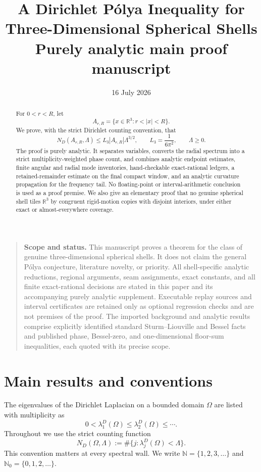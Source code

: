 \documentclass[11pt]{article}
\title{A Dirichlet P\'olya Inequality for\\Three-Dimensional Spherical Shells\\[0.4em]
\large Purely analytic main proof manuscript}
\author{}
\date{16 July 2026}
\numberwithin{equation}{section}
\theoremstyle{definition}
\theoremstyle{remark}
\newcommand{\R}{\mathbb R}
\newcommand{\N}{\mathbb N}
\newcommand{\Nzero}{\mathbb N_0}
\begin{document}
\maketitle
\thispagestyle{titlepage}

\begin{quote}
\small
\textbf{Scope and status.}
This manuscript proves a theorem for the class of genuine three-dimensional
spherical shells.  It does not claim the general P\'olya conjecture,
literature novelty, or priority.  All shell-specific analytic reductions,
regional arguments, seam assignments, exact constants, and all finite
exact-rational decisions are stated in this paper and its accompanying
purely analytic supplement.  Executable replay sources and interval
certificates are retained only as optional regression checks and are not
premises of the proof.  The imported background and analytic results
comprise explicitly identified standard Sturm--Liouville and Bessel facts and
published phase, Bessel-zero, and one-dimensional floor-sum inequalities,
each quoted with its precise scope.
\end{quote}

\begin{abstract}
For \(0<r<R\), let
\[
  A_{r,R}=\{x\in\R^3:r<|x|<R\}.
\]
We prove, with the strict Dirichlet counting convention, that
\[
  N_D(A_{r,R},\Lambda)
  \le L_3|A_{r,R}|\Lambda^{3/2},
  \qquad
  L_3=\frac1{6\pi^2},
  \qquad \Lambda\ge0.
\]
The proof is purely analytic.  It separates variables, converts the radial
spectrum into a strict multiplicity-weighted phase count, and combines
analytic endpoint estimates, finite angular and radial mode inventories,
hand-checkable exact-rational ledgers, a retained-remainder estimate on the
final compact window, and an analytic curvature propagation for the frequency
tail.  No floating-point or interval-arithmetic conclusion is used as a proof
premise.  We also give an elementary proof that no genuine spherical
shell tiles \(\R^3\) by congruent rigid-motion copies with disjoint interiors,
under either exact or almost-everywhere coverage.
\end{abstract}

\tableofcontents
\clearpage

\section{Main results and conventions}

The eigenvalues of the Dirichlet Laplacian on a bounded domain \(\Omega\) are
listed with multiplicity as
\[
  0<\lambda_1^D(\Omega)\le\lambda_2^D(\Omega)\le\cdots.
\]
Throughout we use the strict counting function
\begin{equation}
  N_D(\Omega,\Lambda)
  :=\#\{j:\lambda_j^D(\Omega)<\Lambda\}.
  \label{eq:strict-count}
\end{equation}
This convention matters at every spectral wall.  We write
\(\N=\{1,2,3,\ldots\}\) and \(\Nzero=\{0,1,2,\ldots\}\).
\end{document}
